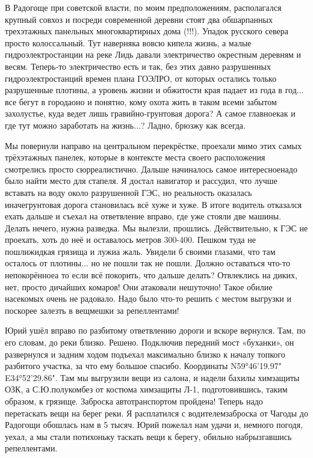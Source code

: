 В Радогоще при советской власти, по моим предположениям, располагался крупный совхоз и посреди современной деревни стоят два обшарпанных трехэтажных панельных многоквартирных дома (!!!). Упадок русского севера просто колоссальный. Тут наверняка вовсю кипела жизнь, а малые гидроэлектростанции на реке Лидь давали электричество окрестным деревням и весям. Теперь-то электричество есть и так, без этих давно разрушенных гидроэлектростанций времен плана ГОЭЛРО, от которых остались только разрушенные плотины, а уровень жизни и обжитости края падает из года в год$\ldots$ все бегут в города\mdash оно и понятно, кому охота жить в таком всеми забытом захолустье, куда ведет лишь гравийно-грунтовая дорога? А самое главное\mdash как и где тут можно заработать на жизнь$\ldots$? Ладно, брюзжу как всегда. 

Мы повернули направо на центральном перекрёстке, проехали мимо этих самых трёхэтажных панелек, которые в контексте места своего расположения смотрелись просто сюрреалистично. Дальше начиналось самое интересное\mdash надо было найти место для стапеля. Я достал навигатор и рассудил, что лучше вставать на воду около разрушенной ГЭС, но реальность оказалась иначе\mdash грунтовая дорога становилась всё хуже и хуже. В итоге водитель отказался ехать дальше и съехал на ответвление вправо, где уже стояли две машины. Делать нечего, нужна разведка. Мы вылезли, прошлись. Действительно, к ГЭС не проехать, хоть до неё и оставалось метров 300-400. Пешком туда не пошли\mdash жидкая грязища и лужи\mdash а жаль. Увидели б своими глазами, что там осталось от плотины$\ldots$ но не пошли так не пошли. Должно оставаться что-то непокорённое\mdash а то если всё покорить, что дальше делать? Отвлеклись на диких, нет, просто дичайших комаров! Они атаковали нешуточно! Такое обилие насекомых очень не радовало. Надо было что-то решить с местом выгрузки и поскорее залезть в вещмешки за репеллентами!

Юрий ушёл вправо по разбитому ответвлению дороги и вскоре вернулся. Там, по его словам, до реки близко. Решено. Подключив передний мост «буханки», он развернулся и задним ходом подъехал максимально близко к началу топкого разбитого участка, за что ему большое спасибо. Координаты N59°46'19.97" E34°52'29.86". Там мы выгрузили вещи из салона, и надели бахилы химзащиты ОЗК, а С.Ю.\mdash полукомбез от костюма химзащиты Л-1, подготовившись, таким образом, к грязище. Заброска автотранспортом пройдена! Теперь надо перетаскать вещи на берег реки. Я расплатился с водителем\mdash заброска от Чагоды до Радогощи обошлась нам в 5 тысяч. Юрий пожелал нам удачи и, немного погодя, уехал, а мы стали потихоньку таскать вещи к берегу, обильно набрызгавшись репеллентами.

